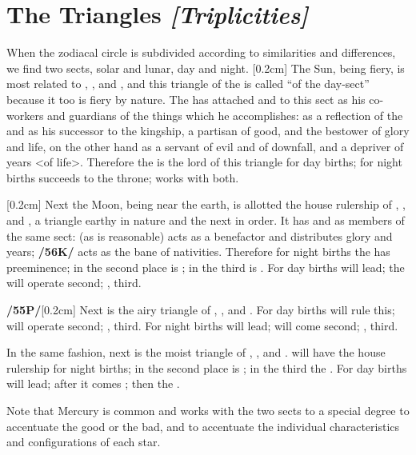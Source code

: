 \section{The Triangles \textit{[Triplicities]}}

When the zodiacal circle is subdivided according to similarities and differences, we find two sects, solar and lunar, day and night. 
[0.2cm]
The Sun, being fiery, is most related to \Aries, \Leo, and \Sagittarius, and this triangle of the \Sun\xspace is called “of the day-sect” because it too is fiery by nature. The \Sun\xspace has attached \Jupiter\xspace and \Saturn\xspace to this sect as his co-workers and guardians of the things which he accomplishes: \Jupiter\xspace as a reflection of the \Sun\xspace and as his successor to the kingship, a partisan of good, and the bestower of glory
and life, \Saturn\xspace on the other hand as a servant of evil and of downfall, and a depriver of years <of life>. Therefore the \Sun\xspace is the lord of this triangle for day births; for night births \Jupiter\xspace succeeds to the throne; \Saturn\xspace works with both.

[0.2cm]
Next the Moon, being near the earth, is allotted the house rulership of \Taurus, \Virgo, and \Capricorn, a triangle earthy in nature and the next in order. It has \Venus\xspace and \Mars\xspace as members of the same sect: \Venus\xspace
(as is reasonable) acts as a benefactor and distributes glory and years; \textbf{/56K/} \Mars\xspace acts as the bane of
nativities. Therefore for night births the \Moon\xspace has preeminence; in the second place is \Venus; in the third
is \Mars. For day births \Venus\xspace will lead; the \Moon\xspace will operate second; \Mars, third.

\textbf{/55P/}[0.2cm] Next is the airy triangle of \Gemini, \Libra, and \Aquarius. For day births \Saturn\xspace will rule this;
\Mercury\xspace will operate second; \Jupiter, third. For night births \Mercury\xspace will lead; \Saturn\xspace will come second; \Jupiter, third.

In the same fashion, next is the moist triangle of \Cancer, \Scorpio, and \Pisces. \Mars\xspace will have the house rulership for night births; in the second place is \Venus; in the third the \Moon. For day births \Venus\xspace will lead; after it comes \Mars; then the \Moon. 

\mndl[0.2cm]
Note that Mercury is common and works with the two sects to a special degree to accentuate the good or the bad, and to accentuate the individual characteristics and configurations of each star.

\newpage